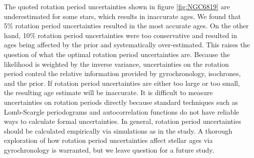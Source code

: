 The quoted rotation period uncertainties shown in figure \ref{fig:NGC6819} are
underestimated for some stars, which results in inaccurate ages.
We found that 5\% rotation period uncertainties resulted in the most accurate
ages.
On the other hand, 10\% rotation period uncertainties were too conservative
and resulted in ages being affected by the prior and systematically
over-estimated.
This raises the question of what the optimal rotation period uncertainties
are.
Because the likelihood is weighted by the inverse variance, uncertainties on
the rotation period control the relative information provided by
gyrochronology, isochrones, and the prior.
If rotation period uncertainties are either too large or too small, the
resulting age estimate will be inaccurate.
It is difficult to measure uncertainties on rotation periods directly because
standard techniques such as Lomb-Scargle periodograms and autocorrelation
functions do not have reliable ways to calculate formal uncertainties.
In general, rotation period uncertainties should be calculated empirically
via simulations as in the \citet{aigrain2015} study.
A thorough exploration of how rotation period uncertainties affect stellar
ages via gyrochronology is warranted, but we leave question for a future
study.


